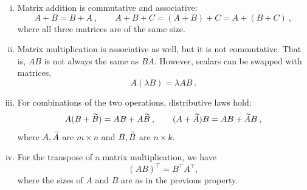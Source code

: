 \begin{properties}
	\label{prop:matrix_mult}
	\begin{enumerate}[(i)]
		\item Matrix addition is commutative and associative:
		\[ A + B = B + A \:, \qquad A+B+C = (A+B)+C = A+(B+C) \:, \]
		where all three matrices are of the same size.
		\item Matrix multiplication is associative as well, but it is not commutative. That is, $AB$ is not always the same as $BA$. However, scalars can be swapped with matrices,
		\[ A(\lambda B) = \lambda A B \:. \]
		\item For combinations of the two operations, distributive laws hold:
		\[ A (B+ \widetilde{B}) = AB + A\widetilde{B} \:, \qquad (A+\widetilde{A})B = AB + \widetilde{A}B \:,\]
		where $A,\widetilde{A}$ are $m \times n$ and $B,\widetilde{B}$ are $n \times k$.
		\item For the transpose of a matrix multiplication, we have
		\[ (AB)^\top = B^\top A^\top,\]
		where the sizes of $A$ and $B$ are as in the previous property.
	\end{enumerate}
\end{properties}

